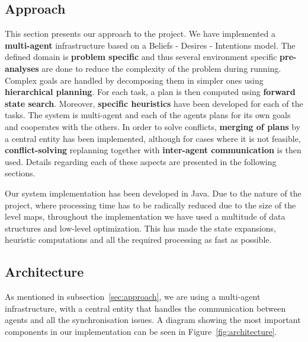 \subsection{Approach}

\label{sec:approach}

This section presents our approach to the project. We have implemented a \textbf{multi-agent} infrastructure
based on a Beliefs - Desires - Intentions model. The defined domain is \textbf{problem specific} and thus
several environment specific \textbf{pre-analyses} are done to reduce the complexity of the problem during
running. Complex goals are handled by decomposing them in simpler ones using \textbf{hierarchical planning}.
For each task, a plan is then computed using \textbf{forward state search}. Moreover, \textbf{specific
heuristics} have been developed for each of the tasks. The system is multi-agent and each of the agents plans
for its own goals and cooperates with the others. In order to solve conflicts, \textbf{merging of plans} by a
central entity has been implemented, although for cases where it is not feasible, \textbf{conflict-solving}
replanning together with \textbf{inter-agent communication} is then used. Details regarding each of these
aspects are presented in the following sections.

Our system implementation has been developed in Java. Due to the nature of the project, where processing time
has to be radically reduced due to the size of the level maps, throughout the implementation we have used a
multitude of data structures and low-level optimization. This has made the state expansions, heuristic
computations and all the required processing as fast as possible.

\subsection{Architecture}
\label{sec:architecture}


As mentioned in subsection~\ref{sec:approach}, we are using a multi-agent infrastructure, with a central
entity that handles the communication between agents and all the synchronisation issues. A diagram showing the
most important components in our implementation can be seen in Figure~\ref{fig:architecture}.

